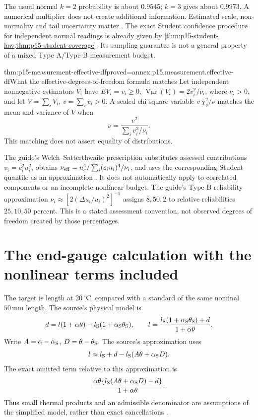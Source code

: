The usual normal \(k=2\) probability is about \(0.9545\); \(k=3\) gives
about \(0.9973\). A numerical multiplier does not create additional
information. Estimated scale, non-normality and tail uncertainty matter
\cite[6.2--6.3]{JCGM1002008EMeasurement}.
The exact Student confidence procedure for independent normal readings
is already given by \cref{thm:p15-student-law,thm:p15-student-coverage}.
Its sampling guarantee is not a general property of a mixed Type A/Type B
measurement budget.

\begin{hbtheorem}{thm:p15-measurement-effective-df}{proved=annex:p15.measurement.effective-df}{What the effective-degrees-of-freedom formula matches}
Let independent nonnegative estimators \(V_i\) have
\(EV_i=v_i\geq0\), \(\operatorname{Var}(V_i)=2v_i^2/\nu_i\),
where \(\nu_i>0\), and let \(V=\sum_i V_i\), \(v=\sum_i v_i>0\).
A scaled chi-square variable \(v\,\chi_\nu^2/\nu\) matches the mean and
variance of \(V\) when
\[
 \nu=\frac{v^2}{\sum_i v_i^2/\nu_i}.
\]
This matching does not assert equality of distributions.
\end{hbtheorem}

The guide's Welch--Satterthwaite prescription substitutes assessed
contributions \(v_i=c_i^2u_i^2\), obtains
\(\nu_{\rm eff}=u_c^4/\sum_i(c_i u_i)^4/\nu_i\), and uses the corresponding
Student quantile as an approximation \cite[G.4]{JCGM1002008EMeasurement}.
It does not automatically apply to correlated components or an incomplete
nonlinear budget. The guide's Type B reliability approximation
\(\nu_i\approx[2(\Delta u_i/u_i)^2]^{-1}\) assigns \(8,50,2\) to relative
reliabilities \(25,10,50\) percent. This is a stated assessment convention,
not observed degrees of freedom created by those percentages.

\section{The end-gauge calculation with the nonlinear terms included}
\label{sec:p15-measurement-gauge}

The target is length at \(20\,{}^\circ\mathrm C\), compared with a standard
of the same nominal \(50\,\mathrm{mm}\) length. The source's physical model is
\[
 d=l(1+\alpha\theta)-l_{\rm S}(1+\alpha_{\rm S}\theta_{\rm S}),
 \qquad
 l=\frac{l_{\rm S}(1+\alpha_{\rm S}\theta_{\rm S})+d}{1+\alpha\theta}.
\]
Write \(A=\alpha-\alpha_{\rm S}\), \(D=\theta-\theta_{\rm S}\).
The source's approximation uses
\[
 l\approx l_{\rm S}+d-l_{\rm S}(A\theta+\alpha_{\rm S}D).
\]
The exact omitted term relative to this approximation is
\[
 \frac{\alpha\theta\{l_{\rm S}(A\theta+\alpha_{\rm S}D)-d\}}
      {1+\alpha\theta}.
\]
Thus small thermal products and an admissible denominator are assumptions
of the simplified model, rather than exact cancellations
\cite[H.1.1--H.1.2]{JCGM1002008EMeasurement}.

